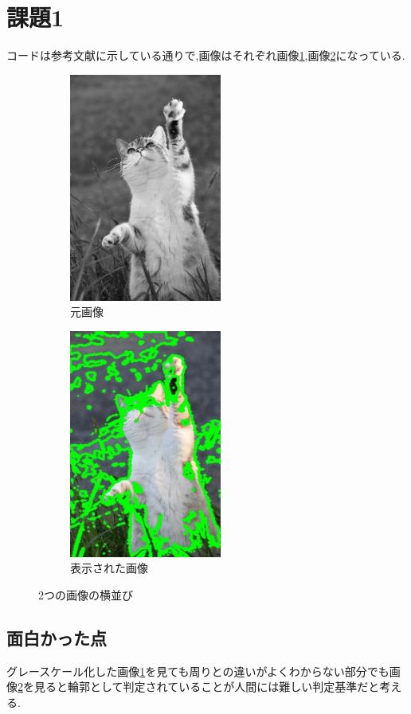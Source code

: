 \documentclass[a4paper, 11pt]{jsarticle}
\begin{document}
\section{課題1}
コードは参考文献\cite{one}に示している通りで,画像はそれぞれ画像\ref{img2},画像\ref{img3}になっている.
\begin{figure}[htbp]
  \begin{subfigure}{0.5\textwidth}
    \centering
    \includegraphics[width=50mm]{original.jpg}
    \caption{元画像}
    \label{img2}
  \end{subfigure}%
  \begin{subfigure}{0.5\textwidth}
    \centering
    \includegraphics[width=50mm]{drawn.jpg}
    \caption{表示された画像}
    \label{img3}
  \end{subfigure}
  \caption{2つの画像の横並び}
  \label{fig:side-by-side}
\end{figure}
\subsection{面白かった点}
グレースケール化した画像\ref{img2}を見ても周りとの違いがよくわからない部分でも画像\ref{img3}を見ると輪郭として判定されていることが人間には難しい判定基準だと考える.
\clearpage
\end{document}
